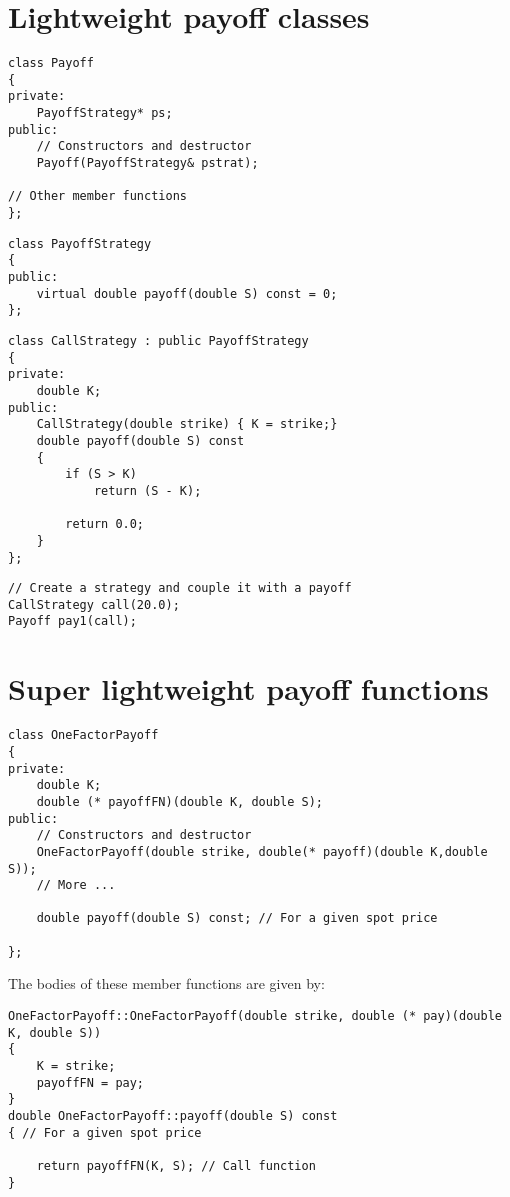 \section{Lightweight payoff classes}

\begin{lstlisting}
class Payoff
{
private:
	PayoffStrategy* ps;
public:
	// Constructors and destructor
	Payoff(PayoffStrategy& pstrat);

// Other member functions
};
\end{lstlisting}

\begin{lstlisting}
class PayoffStrategy
{
public:
	virtual double payoff(double S) const = 0;
};
\end{lstlisting}

\begin{lstlisting}
class CallStrategy : public PayoffStrategy
{
private:
	double K;
public:
	CallStrategy(double strike) { K = strike;}
	double payoff(double S) const
	{
		if (S > K)
			return (S - K);

		return 0.0;
	}
};
\end{lstlisting}

\begin{lstlisting}
// Create a strategy and couple it with a payoff
CallStrategy call(20.0);
Payoff pay1(call);
\end{lstlisting}

\section{Super lightweight payoff functions}

\begin{lstlisting}
class OneFactorPayoff
{
private:
	double K;
	double (* payoffFN)(double K, double S);
public:
	// Constructors and destructor
	OneFactorPayoff(double strike, double(* payoff)(double K,double S));
	// More ...

	double payoff(double S) const; // For a given spot price

};
\end{lstlisting}

The bodies of these member functions are given by:

\begin{lstlisting}
OneFactorPayoff::OneFactorPayoff(double strike, double (* pay)(double K, double S))
{
	K = strike;
	payoffFN = pay;
}
double OneFactorPayoff::payoff(double S) const
{ // For a given spot price

	return payoffFN(K, S); // Call function
}
\end{lstlisting}

